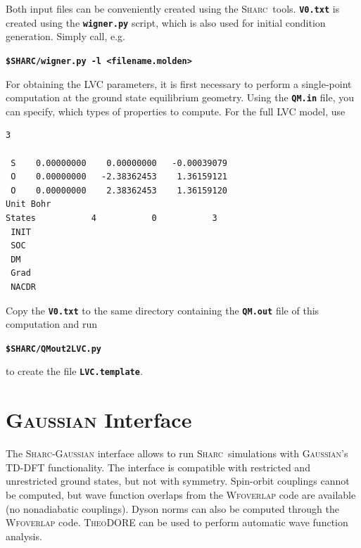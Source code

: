 \documentclass[a4paper,10pt,DIV=15,openany,twoside=false]{scrbook}
\newcommand{\sharc}{\textsc{Sharc}}
\newcommand{\ttt}[1]{\textbf{\texttt{#1}}}
\newenvironment{example}{
  \setlength{\OuterFrameSep}{3pt}
  \vspace{0mm}
  \definecolor{shadecolor}{HTML}{E4F4FF}
  \begin{shaded}
}{
  \end{shaded}
}
\begin{document}
Both input files can be conveniently created using the \sharc\ tools. \ttt{V0.txt} is created using the \ttt{wigner.py} script, which is also used for initial condition generation. Simply call, e.g.

\begin{example}
\ttt{\$SHARC/wigner.py -l <filename.molden>}
\end{example}

For obtaining the LVC parameters, it is first necessary to perform a single-point computation at the ground state equilibrium geometry.
Using the \ttt{QM.in} file, you can specify, which types of properties to compute. For the full LVC model, use

\begin{example}
\begin{verbatim}
3

 S    0.00000000    0.00000000   -0.00039079 
 O    0.00000000   -2.38362453    1.36159121 
 O    0.00000000    2.38362453    1.36159120 
Unit Bohr
States           4           0           3
 INIT
 SOC
 DM
 Grad
 NACDR
\end{verbatim}
\end{example}

Copy the \ttt{V0.txt} to the same directory containing the \ttt{QM.out} file of this computation and run

\begin{example}
\ttt{\$SHARC/QMout2LVC.py}
\end{example}

to create the file \ttt{LVC.template}.


\section{\textsc{Gaussian} Interface}\label{sec:int:gaussian}

The \sharc-\textsc{Gaussian} interface allows to run \sharc\ simulations with \textsc{Gaussian}'s TD-DFT functionality.
The interface is compatible with restricted and unrestricted ground states, but not with symmetry.
Spin-orbit couplings cannot be computed, but wave function overlaps from the \textsc{Wfoverlap} code are available (no nonadiabatic couplings).
Dyson norms can also be computed through the \textsc{Wfoverlap} code.
\textsc{TheoDORE} can be used to perform automatic wave function analysis.
\end{document}
